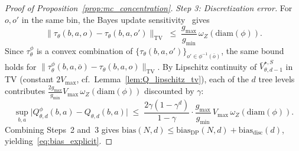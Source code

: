 \begin{proof}[Proof of Proposition~\ref{prop:mc_concentration}]
\emph{Step 3: Discretization error.}
For $o,o'$ in the same bin, the Bayes update sensitivity~\citep[Section~4.3]{doucmoulinesolsson2014} gives
\[
\|\tau_\theta(b,a,o)-\tau_\theta(b,a,o')\|_{\mathrm{TV}}
\;\le\;
\frac{g_{\max}}{g_{\min}}\,\omega_Z(\mathrm{diam}(\phi)).
\]
Since $\tau_\theta^{\phi}$ is a convex combination of $\{\tau_\theta(b,a,o')\}_{o'\in\phi^{-1}(\bar o)}$, the same bound holds for $\|\tau_\theta^{\phi}(b,a,\bar o)-\tau_\theta(b,a,o)\|_{\mathrm{TV}}$.
By Lipschitz continuity of $\bar V_{\theta,d-1}^{\star,S}$ in TV (constant $2V_{\max}$, cf.\ Lemma~\ref{lem:Q_lipschitz_tv}), each of the $d$ tree levels contributes $\frac{2g_{\max}}{g_{\min}}V_{\max}\,\omega_Z(\mathrm{diam}(\phi))$ discounted by $\gamma$:
\begin{equation}\label{eq:disc_error_total}
\sup_{b,a}\bigl|Q_{\theta,d}^{\phi}(b,a)-Q_{\theta,d}(b,a)\bigr|
\;\le\;
\frac{2\gamma(1-\gamma^d)}{1-\gamma}\cdot\frac{g_{\max}}{g_{\min}}\,V_{\max}\,\omega_Z(\mathrm{diam}(\phi)).
\end{equation}
Combining Steps~2 and~3 gives $\mathrm{bias}(N,d)\le\mathrm{bias}_{\mathrm{DP}}(N,d)+\mathrm{bias}_{\mathrm{disc}}(d)$, yielding~\eqref{eq:bias_explicit}.
\end{proof}

